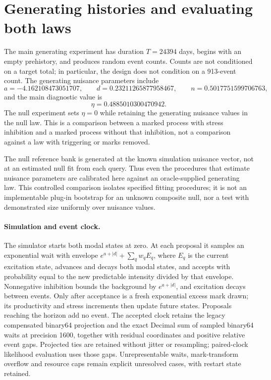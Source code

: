 \section{Generating histories and evaluating both laws}

The main generating experiment has duration \(T=24394\) days, begins with an empty prehistory, and produces random event counts. Counts are not conditioned on a target total; in particular, the design does not condition on a 913-event count. The generating nuisance parameters include
\[
a=-4.162108473051707,\qquad
d=0.23211265877958467,\qquad
n=0.5017751599706763,
\]
and the main diagnostic value is
\[
\eta=0.4885010300470942.
\]
The null experiment sets \(\eta=0\) while retaining the generating nuisance values in the null law. This is a comparison between a marked process with stress inhibition and a marked process without that inhibition, not a comparison against a law with triggering or marks removed.

The null reference bank is generated at the known simulation nuisance vector, not at an estimated null fit from each query. Thus even the procedures that estimate nuisance parameters are calibrated here against an oracle-supplied generating law. This controlled comparison isolates specified fitting procedures; it is not an implementable plug-in bootstrap for an unknown composite null, nor a test with demonstrated size uniformly over nuisance values.

\paragraph{Simulation and event clock.}
The simulator starts both modal states at zero. At each proposal it samples an exponential wait with envelope \(e^{a+|d|}+\sum_qw_qE_q\), where \(E_q\) is the current excitation state, advances and decays both modal states, and accepts with probability equal to the new predictable intensity divided by that envelope. Nonnegative inhibition bounds the background by \(e^{a+|d|}\), and excitation decays between events. Only after acceptance is a fresh exponential excess mark drawn; its productivity and stress increments then update future states. Proposals reaching the horizon add no event. The accepted clock retains the legacy compensated binary64 projection and the exact Decimal sum of sampled binary64 waits at precision 1600, together with residual coordinates and positive relative event gaps. Projected ties are retained without jitter or resampling; paired-clock likelihood evaluation uses those gaps. Unrepresentable waits, mark-transform overflow and resource caps remain explicit unresolved cases, with restart state retained.


